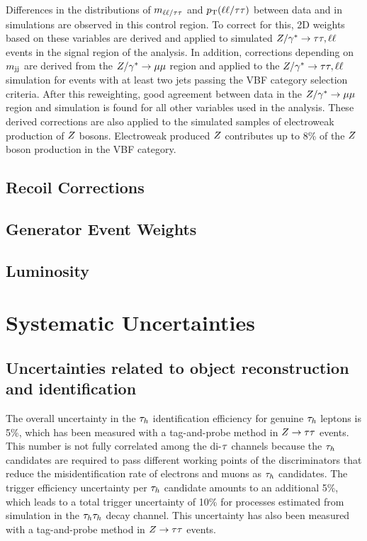 Differences in the distributions of $m_{\ell\ell/\tau\tau}$ and $p_\mathrm{T}(\ell\ell/\tau\tau)$ between data and 
in simulations are observed in this control region. To correct for this, 2D weights based on these variables 
are derived and applied to simulated $Z/\gamma^*\to\tau\tau, \ell\ell$ events in the signal region of the analysis. 
In addition, corrections depending on $m_\mathrm{jj}$ are derived from the $Z/\gamma^*\to\mu\mu$ region and 
applied to the $Z/\gamma^*\to\tau\tau, \ell\ell$ simulation for events with at least two jets passing the 
VBF category selection criteria. After this reweighting, good agreement between data in the 
$Z/\gamma^*\to\mu\mu$ region and simulation is found for all other variables used in the analysis.
These derived corrections are also applied to the simulated samples of electroweak production of $Z$ 
bosons. Electroweak produced $Z$ contributes up to 8\% of the $Z$ boson production in the VBF category.



\subsection{Recoil Corrections}



\subsection{Generator Event Weights}
\subsection{Luminosity}

\pagebreak

\section{Systematic Uncertainties}
\label{sec:htt_systematics}

\subsection{Uncertainties related to object reconstruction and identification}

The overall uncertainty in the $\tau_{h}$ identification efficiency for genuine $\tau_{h}$ leptons is 5\%, 
which has been measured with a tag-and-probe method in $Z\to\tau\tau$ events.
This number is not fully correlated among the di-$\tau$ channels because the $\tau_{h}$ candidates are required to pass
different working points of the discriminators that reduce the misidentification rate of electrons and muons as $\tau_{h}$ candidates.
The trigger efficiency uncertainty per $\tau_{h}$ candidate amounts to an additional 5\%, which leads to a total 
trigger uncertainty of 10\% for processes estimated from simulation in the $\tau_{h}\tau_{h}$ decay channel. This 
uncertainty has also been measured with a tag-and-probe method in $Z\to\tau\tau$ events.

